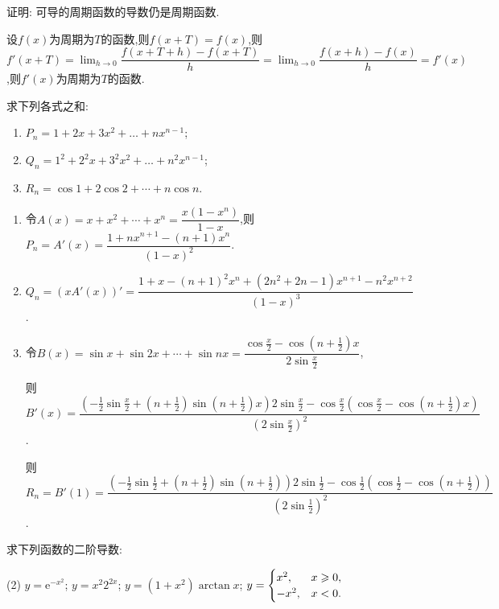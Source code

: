 \begin{exercise}[3.1.16]
    证明: 可导的周期函数的导数仍是周期函数.
\end{exercise}

\begin{solution}
    设$f(x)$为周期为$T$的函数,则$f(x+T) = f(x)$,则$f'(x+T) = \lim_{h \to 0} \dfrac{f(x+T+h) - f(x+T)}{h} = \lim_{h \to 0} \dfrac{f(x+h) - f(x)}{h} = f'(x)$,则$f'(x)$为周期为$T$的函数.
\end{solution}

\begin{exercise}[3.1.17]
    求下列各式之和:
    \begin{enumerate}
        \item $P_n=1+2x+3x^2+\dots+nx^{n-1}$;
        \item $Q_n=1^2+2^2x+3^2x^2+\dots+n^2x^{n-1}$;
        \item $R_n = \cos 1 + 2\cos 2 + \cdots + n\cos n$.
    \end{enumerate}
\end{exercise}

\begin{solution}
    \begin{enumerate}
        \item 令$A(x) = x + x^2 + \cdots + x^n = \dfrac{x(1-x^n)}{1-x}$,则$P_n = A'(x) = \dfrac{1 + nx^{n+1} -(n+1) x^n}{(1-x)^2}$.
        \item $Q_n = \left( x A'(x) \right)' = \dfrac{1 + x - (n+1)^2 x^n +(2n^2 +2n -1) x^{n+1} - n^2 x^{n+2}}{(1-x)^3}$.
        \item 令$B(x) = \sin x + \sin 2x + \cdots + \sin nx = \dfrac{\cos \frac{x}{2} - \cos \left( n + \frac{1}{2} \right) x}{2 \sin \frac{x}{2}}$,

              则$B'(x) = \dfrac{\left( -\frac12 \sin \frac{x}2 + \left( n + \frac12 \right) \sin \left( n + \frac12 \right) x \right) 2 \sin \frac{x}{2} - \cos \frac{x}{2} \left( \cos \frac{x}{2} - \cos \left( n + \frac12 \right) x \right)}{\left(2 \sin \frac{x}{2} \right)^2}$.

              则$R_n = B'(1) = \dfrac{\left( -\frac12 \sin \frac{1}2 + \left( n + \frac12 \right) \sin \left( n + \frac12 \right) \right) 2 \sin \frac{1}{2} - \cos \frac{1}{2} \left( \cos \frac{1}{2} - \cos \left( n + \frac12 \right) \right)}{\left(2 \sin \frac{1}{2} \right)^2}$.
    \end{enumerate}
\end{solution}

\begin{exercise}[3.1.18]
    求下列函数的二阶导数:
    \begin{tasks}[label=(\arabic*)](2)
        \task $y = \mathrm{e}^{-x^2}$;
        \task $y = x^2 2^{2x}$;
        \task $y = (1+x^2)\arctan x$;
        \task $y = \begin{cases} x^2, & x \geqslant 0, \\ -x^2, & x < 0. \end{cases}$
    \end{tasks}
\end{exercise}

